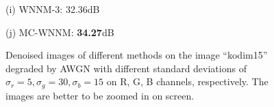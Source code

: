 \documentclass[10pt,onecolumn,letterpaper]{article}
\begin{document}
\begin{figure}[!htbp]
{\begin{minipage}[t]{0.24\textwidth}
{\footnotesize (i) WNNM-3: 32.36dB }
\end{minipage}
\begin{minipage}[t]{0.24\textwidth}
\centering
{}
{\footnotesize (j) MC-WNNM: \textbf{34.27}dB}
\end{minipage}
}
\caption{Denoised images of different methods on the image ``kodim15'' degraded by AWGN with different standard deviations of $\sigma_{r}=5, \sigma_{g}=30, \sigma_{b}=15$ on R, G, B channels, respectively. The images are better to be zoomed in on screen.}
\label{f6}
\end{figure}
\end{document}
